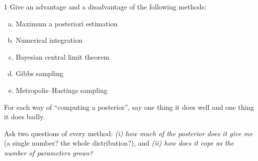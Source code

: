 \documentclass[11pt]{article}
\begin{document}
\clearpage


\begin{problem}{1}
Give an advantage and a disadvantage of the following methods:
\begin{enumerate}[(a)]
\item Maximum a posteriori estimation
\item Numerical integration
\item Bayesian central limit theorem
\item Gibbs sampling
\item Metropolis--Hastings sampling
\end{enumerate}
\end{problem}

\begin{restate}
For each way of ``computing a posterior'', say one thing it does well and one thing it does badly.
\end{restate}

\begin{keyidea}
Ask two questions of every method: \emph{(i) how much of the posterior does it give me} (a single number? the whole distribution?), and \emph{(ii) how does it cope as the number of parameters grows?}
\end{keyidea}
\end{document}
